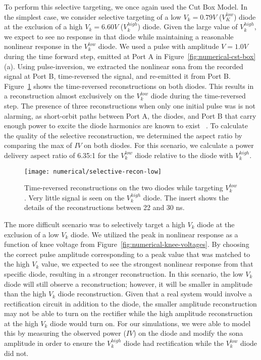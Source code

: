 To perform this selective targeting, we once again used the Cut Box Model. In the simplest case, we consider selective targeting of a low $V_{k} = 0.79V$ ($V_K^{low}$) diode at the exclusion of a high $V_{k} = 6.60V$ ($V_k^{high}$) diode. Given the large value of $V_k^{high}$, we expect to see no response in that diode while maintaining a reasonable nonlinear response in the $V_k^{low}$ diode. We used a pulse with amplitude $V = 1.0 V$ during the time forward step, emitted at Port A in Figure~\ref{fig:numerical-cst-box}(a). Using pulse-inversion, we extracted the nonlinear sona from the recorded signal at Port B, time-reversed the signal, and re-emitted it from Port B. Figure~\ref{fig:numerical-selective-recon-low} shows the time-reversed reconstructions on both diodes. This results in a reconstruction almost exclusively on the $V_k^{low}$ diode during the time-reversed step. The presence of three reconstructions when only one initial pulse was  is not alarming, as short-orbit paths between Port A, the diodes, and Port B that carry enough power to excite the diode harmonics are known to exist ~\cite{hansjurgenstockmann2006}. To calculate the quality of the selective reconstruction, we determined the aspect ratio by comparing the max of $IV$ on both diodes. For this scenario, we calculate a power delivery aspect ratio of 6.35:1 for the $V_k^{low}$ diode relative to the diode with $V_k^{high}$.

\begin{figure}[t]
\centering
\texttt{[image: numerical/selective-recon-low]}
\caption[Selective reconstruction on a $V_{k}^{low}$ diode]{Time-reversed reconstructions on the two diodes while targeting $V_{k}^{low}$. Very little signal is seen on the $V_{k}^{high}$ diode. The insert shows the details of the reconstructions between 22 and 30 ns.}
\label{fig:numerical-selective-recon-low}
\end{figure}

The more difficult scenario was to selectively target a high $V_k$ diode at the exclusion of a low $V_k$ diode. We utilized the peak in nonlinear response as a function of knee voltage from Figure~\ref{fig:numerical-knee-voltages}. By choosing the correct pulse amplitude corresponding to a peak value that was matched to the high $V_k$ value, we expected to see the strongest nonlinear response from that specific diode, resulting in a stronger reconstruction. In this scenario, the low $V_k$ diode will still observe a reconstruction; however, it will be smaller in amplitude than the high $V_k$ diode reconstruction. Given that a real system would involve a rectification circuit in addition to the diode, the smaller amplitude reconstruction may not be able to turn on the rectifier while the high amplitude reconstruction at the high $V_k$ diode would turn on. For our simulations, we were able to model this by measuring the observed power ($IV$) on the diode and modify the sona amplitude in order to ensure the $V_k^{high}$ diode had rectification while the $V_k^{low}$ diode did not.

